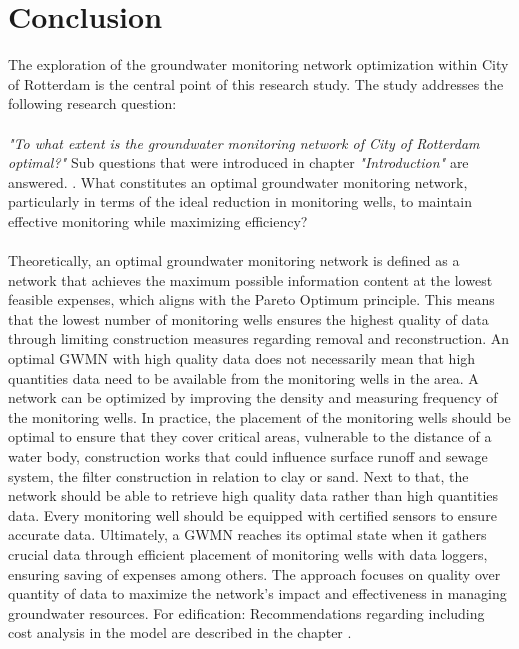 \chapter{Conclusion}
\label{chapter:conclusion}

The exploration of the groundwater monitoring network optimization within City of Rotterdam is the central point of this research study. The study addresses the following research question:\\
\\
\textit{"To what extent is the groundwater monitoring network of City of Rotterdam optimal?"}
\newline
\newline
Sub questions that were introduced in chapter  \textit{"Introduction"} are answered.
\newline
{}. What constitutes an optimal groundwater monitoring network, particularly in terms of the ideal reduction in monitoring wells, to maintain effective monitoring while maximizing efficiency? \\
\\
Theoretically, an optimal groundwater monitoring network is defined as a network that achieves the maximum possible information content at the lowest feasible expenses, which aligns with the Pareto Optimum principle. This means that the lowest number of monitoring wells ensures the highest quality of data through limiting construction measures regarding removal and reconstruction. An optimal GWMN with high quality data does not necessarily mean that high quantities data need to be available from the monitoring wells in the area. A network can be optimized by improving the density and measuring frequency of the monitoring wells. In practice, the placement of the monitoring wells should be optimal to ensure that they cover critical areas, vulnerable to the distance of a water body, construction works that could influence surface runoff and sewage system, the filter construction in relation to clay or sand. Next to that, the network should be able to retrieve high quality data rather than high quantities data. Every monitoring well should be equipped with certified sensors to ensure accurate data. Ultimately, a GWMN reaches its optimal state when it gathers crucial data through efficient placement of monitoring wells with data loggers, ensuring saving of expenses among others. The approach focuses on quality over quantity of data to maximize the network's impact and effectiveness in managing groundwater resources. For edification: Recommendations regarding including cost analysis in the model are described in the chapter .\\
